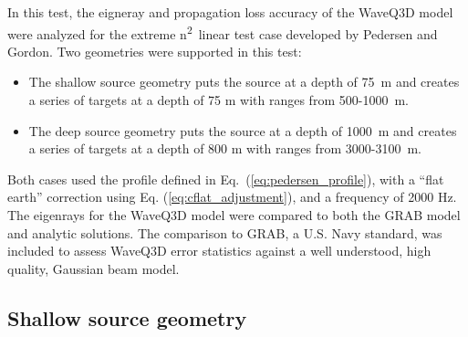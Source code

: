\documentclass{ws-jca}
\begin{document}
In this test, the eigneray and propagation loss accuracy of the WaveQ3D model
were analyzed for the extreme n\textsuperscript{2}~linear test case
developed by Pedersen and Gordon.\cite{Pedersen1972} Two geometries were
supported in this test: 
\begin{itemize} 
\item The shallow source geometry puts the source at a depth of 75~m and
creates a series of targets at a depth of 75 m with ranges from 500-1000~m.
\item The deep source geometry puts the source at a depth of 1000~m and
creates a series of targets at a depth of 800 m with ranges from
3000-3100~m.
\end{itemize} 
Both cases used the profile defined in Eq.~(\ref{eq:pedersen_profile}),
with a ``flat earth'' correction using Eq. (\ref{eq:cflat_adjustment}), and
a frequency of 2000 Hz. The eigenrays for the WaveQ3D model were compared to
both the GRAB model\cite{GRAB2008} and analytic solutions. The comparison
to GRAB, a U.S. Navy standard, was included to assess WaveQ3D error statistics
against a well understood, high quality, Gaussian beam model.

\subsection*{Shallow source geometry}
\end{document}
